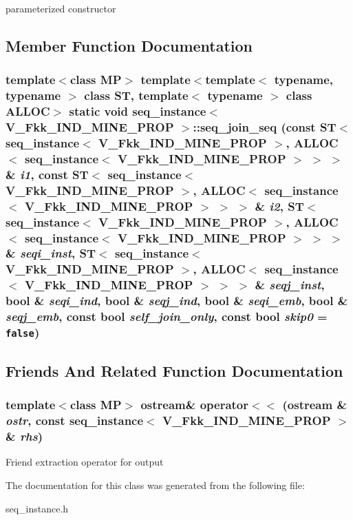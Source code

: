 parameterized constructor 

\subsection{Member Function Documentation}
\subsubsection{\setlength{\rightskip}{0pt plus 5cm}template$<$class MP$>$ template$<$template$<$ typename, typename $>$ class ST, template$<$ typename $>$ class ALLOC$>$ static void \bf{seq\_\-instance}$<$ V\_\-Fkk\_\-IND\_\-MINE\_\-PROP $>$::seq\_\-join\_\-seq (const ST$<$ \bf{seq\_\-instance}$<$ V\_\-Fkk\_\-IND\_\-MINE\_\-PROP $>$, ALLOC$<$ \bf{seq\_\-instance}$<$ V\_\-Fkk\_\-IND\_\-MINE\_\-PROP $>$ $>$ $>$ \& {\em i1}, const ST$<$ \bf{seq\_\-instance}$<$ V\_\-Fkk\_\-IND\_\-MINE\_\-PROP $>$, ALLOC$<$ \bf{seq\_\-instance}$<$ V\_\-Fkk\_\-IND\_\-MINE\_\-PROP $>$ $>$ $>$ \& {\em i2}, ST$<$ \bf{seq\_\-instance}$<$ V\_\-Fkk\_\-IND\_\-MINE\_\-PROP $>$, ALLOC$<$ \bf{seq\_\-instance}$<$ V\_\-Fkk\_\-IND\_\-MINE\_\-PROP $>$ $>$ $>$ \& {\em seqi\_\-inst}, ST$<$ \bf{seq\_\-instance}$<$ V\_\-Fkk\_\-IND\_\-MINE\_\-PROP $>$, ALLOC$<$ \bf{seq\_\-instance}$<$ V\_\-Fkk\_\-IND\_\-MINE\_\-PROP $>$ $>$ $>$ \& {\em seqj\_\-inst}, bool \& {\em seqi\_\-ind}, bool \& {\em seqj\_\-ind}, bool \& {\em seqi\_\-emb}, bool \& {\em seqj\_\-emb}, const bool {\em self\_\-join\_\-only}, const bool {\em skip0} = {\tt false})\hspace{0.3cm}{\tt  [inline, static]}}\label{classseq__instance_3_01V__Fkk__IND__MINE__PROP_01_4_3b27452c8cc82536496f73b204ab2d59}




\subsection{Friends And Related Function Documentation}
\subsubsection{\setlength{\rightskip}{0pt plus 5cm}template$<$class MP$>$ ostream\& operator$<$$<$ (ostream \& {\em ostr}, const \bf{seq\_\-instance}$<$ V\_\-Fkk\_\-IND\_\-MINE\_\-PROP $>$ \& {\em rhs})\hspace{0.3cm}{\tt  [friend]}}\label{classseq__instance_3_01V__Fkk__IND__MINE__PROP_01_4_49d2cbc2a815e4807ced2f9406c8c859}


Friend extraction operator for output 

The documentation for this class was generated from the following file:\begin{CompactItemize}
\item 
seq\_\-instance.h\end{CompactItemize}
